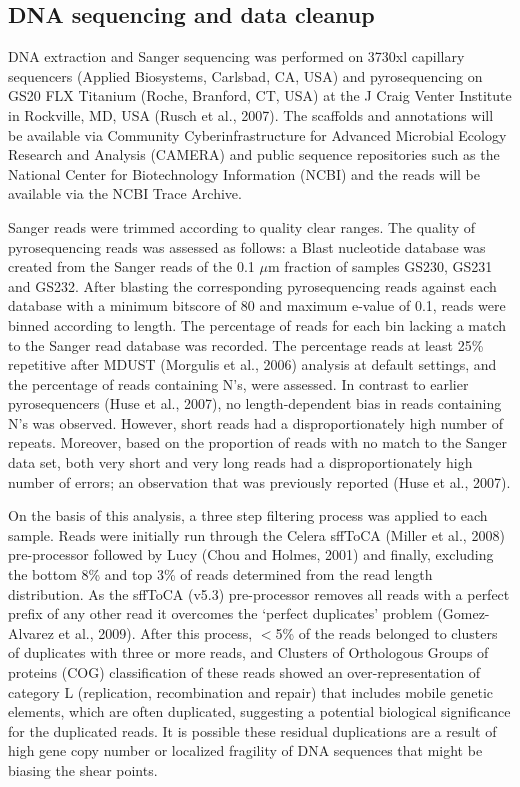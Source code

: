 \subsection{DNA sequencing and data cleanup}
DNA extraction and Sanger sequencing was performed on 3730xl capillary sequencers (Applied Biosystems, Carlsbad, CA, USA) and pyrosequencing on GS20 FLX Titanium (Roche, Branford, CT, USA) at the J Craig Venter Institute in Rockville, MD, USA (Rusch et al., 2007). 
The scaffolds and annotations will be available via Community Cyberinfrastructure for Advanced Microbial Ecology Research and Analysis (CAMERA) and public sequence repositories such as the National Center for Biotechnology Information (NCBI) and the reads will be available via the NCBI Trace Archive. 

Sanger reads were trimmed according to quality clear ranges.
The quality of pyrosequencing reads was assessed as follows: 
a Blast nucleotide database was created from the Sanger reads of the 0.1 $\mu$m fraction of samples GS230, GS231 and GS232. 
After blasting the corresponding pyrosequencing reads against each database with a minimum bitscore of 80 and maximum e-value of 0.1, reads were binned according to length.
The percentage of reads for each bin lacking a match to the Sanger read database was recorded. 
The percentage reads at least 25\% repetitive after MDUST (Morgulis et al., 2006) analysis at default settings, and the percentage of reads containing N’s, were assessed. 
In contrast to earlier pyrosequencers (Huse et al., 2007), no length-dependent bias in reads containing N’s was observed. 
However, short reads had a disproportionately high number of repeats. 
Moreover, based on the proportion of reads with no match to the Sanger data set, both very short and very long reads had a disproportionately high number of errors; an observation that was previously reported (Huse et al., 2007).

On the basis of this analysis, a three step filtering process was applied to each sample. 
Reads were initially run through the Celera sffToCA (Miller et al., 2008) pre-processor followed by Lucy (Chou and Holmes, 2001) and finally, excluding the bottom 8\% and top 3\% of reads determined from the read length distribution. 
As the sffToCA (v5.3) pre-processor removes all reads with a perfect prefix of any other read it overcomes the `perfect duplicates’ problem (Gomez-Alvarez et al., 2009). 
After this process, $<$5\% of the reads belonged to clusters of duplicates with three or more reads, and Clusters of Orthologous Groups of proteins (COG) classification of these reads showed an over-representation of category L (replication, recombination and repair) that includes mobile genetic elements, which are often duplicated, suggesting a potential biological significance for the duplicated reads. 
It is possible these residual duplications are a result of high gene copy number or localized fragility of DNA sequences that might be biasing the shear points.


